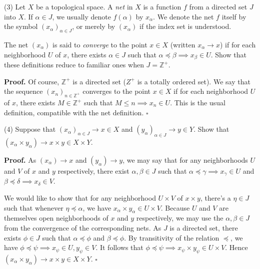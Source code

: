 \documentclass[a4paper]{article}
\newcommand{\Z}{\mathbb{Z}}
\begin{document}
\vspace{0.5cm}

(3) Let $X$ be a topological space. A \emph{net} in $X$ is a function $f$ from a directed set $J$ into $X$. If $\alpha \in J$, we usually denote $f(\alpha)$ by $x_\alpha$. We denote the net $f$ itself by the symbol $(x_\alpha)_{\alpha \in J}$, or merely by $(x_\alpha)$ if the index set is understood.

The net $(x_\alpha)$ is said to \emph{converge} to the point $x \in X$ (written $x_\alpha \to x$) if for each neighborhood $U$ of $x$, there exists $\alpha \in J$ such that $\alpha \preceq \beta \implies x_\beta \in U$. Show that these definitions reduce to familiar ones when $J = \Z^+$.

\textbf{Proof.} Of course, $\Z^+$ is a directed set ($Z^+$ is a totally ordered set). We say that the sequence $(x_n)_{n \in \Z^+}$ converges to the point $x \in X$ if for each neighborhood $U$ of $x$, there exists $M \in \Z^+$ such that $M \leq n \implies x_n \in U$. This is the usual definition, compatible with the net definition. $\square$

\vspace{0.5cm}

(4) Suppose that $(x_\alpha)_{\alpha \in J} \to x \in X$ and $(y_\alpha)_{\alpha \in J} \to y \in Y$. Show that $(x_\alpha \times y_\alpha) \to x \times y \in X \times Y$.

\textbf{Proof.} As $(x_\alpha) \to x$ and $(y_\alpha) \to y$, we may say that for any neighborhoods $U$ and $V$ of $x$ and $y$ respectively, there exist $\alpha, \beta \in J$ such that $\alpha \preceq \gamma \implies x_\gamma \in U$ and $\beta \preceq \delta \implies x_\delta \in V$.

We would like to show that for any neighborhood $U \times V$ of $x \times y$, there's a $\eta \in J$ such that whenever $\eta \preceq \alpha$, we have $x_\alpha \times y_\alpha \in U \times V$. Because $U$ and $V$ are themselves open neighborhoods of $x$ and $y$ respectively, we may use the $\alpha, \beta \in J$ from the convergence of the corresponding nets. As $J$ is a directed set, there exists $\phi \in J$ such that $\alpha \preceq \phi$ and $\beta \preceq \phi$. By transitivity of the relation $\preceq$, we have $\phi \preceq \psi \implies x_\psi \in U, y_\psi \in V$. It follows that $\phi \preceq \psi \implies x_\psi \times y_\psi \in U \times V$. Hence $(x_\alpha \times y_\alpha) \to x \times y \in X \times Y$. $\square$

\vspace{0.5cm}
\end{document}
